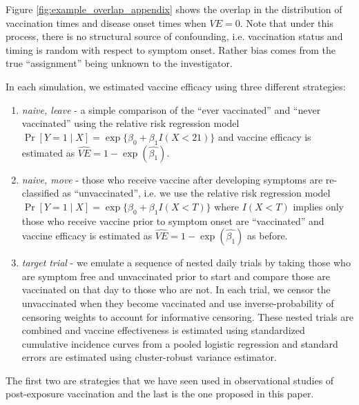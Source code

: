 \begin{appendix}
    Figure \ref{fig:example_overlap_appendix} shows the overlap in the distribution of vaccination times and disease onset times when $VE = 0$. Note that under this process, there is no structural source of confounding, i.e. vaccination status and timing is random with respect to symptom onset. Rather bias comes from the true ``assignment'' being unknown to the investigator.

    In each simulation, we estimated vaccine efficacy using three different strategies:
    \begin{enumerate}
        \item \textit{naive, leave} - a simple comparison of the ``ever vaccinated'' and ``never vaccinated'' using the relative risk regression model $\Pr[Y = 1 \mid X] = \operatorname{exp}\{\beta_0 + \beta_1 I(X < 21)\}$ and vaccine efficacy is estimated as $\widehat{VE} = 1 - \exp(\widehat{\beta_1})$.
        \item \textit{naive, move} - those who receive vaccine after developing symptoms are re-classified as ``unvaccinated'', i.e. we use the relative risk regression model $\Pr[Y = 1 \mid X] = \operatorname{exp}\{\beta_0 + \beta_1 I(X < T)\}$ where $I(X<T)$ implies only those who receive vaccine prior to symptom onset are ``vaccinated'' and vaccine efficacy is estimated as $\widehat{VE} = 1 - \exp(\widehat{\beta_1})$ as before.
        \item \textit{target trial} - we emulate a sequence of nested daily trials by taking those who are symptom free and unvaccinated prior to start and compare those are vaccinated on that day to those who are not. In each trial, we censor the unvaccinated when they become vaccinated and use inverse-probability of censoring weights to account for informative censoring. These nested trials are combined and vaccine effectiveness is estimated using standardized cumulative incidence curves from a pooled logistic regression and standard errors are estimated using cluster-robust variance estimator.
    \end{enumerate}
    The first two are strategies that we have seen used in observational studies of post-exposure vaccination and the last is the one proposed in this paper.


\end{appendix}
